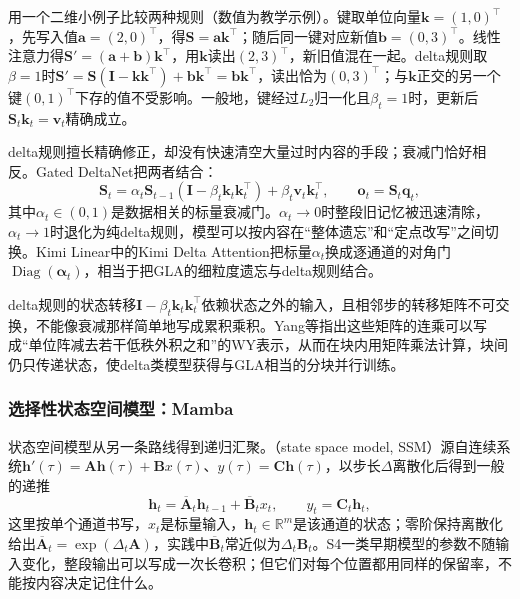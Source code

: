 用一个二维小例子比较两种规则（数值为教学示例）。键取单位向量$\bm k=(1,0)^{\top}$，先写入值$\bm a=(2,0)^{\top}$，得$\bm S=\bm a\bm k^{\top}$；随后同一键对应新值$\bm b=(0,3)^{\top}$。线性注意力得$\bm S'=(\bm a+\bm b)\bm k^{\top}$，用$\bm k$读出$(2,3)^{\top}$，新旧值混在一起。delta规则取$\beta=1$时$\bm S'=\bm S(\bm I-\bm k\bm k^{\top})+\bm b\bm k^{\top}=\bm b\bm k^{\top}$，读出恰为$(0,3)^{\top}$；与$\bm k$正交的另一个键$(0,1)^{\top}$下存的值不受影响。一般地，键经过$L_2$归一化且$\beta_t=1$时，更新后$\bm S_t\bm k_t=\bm v_t$精确成立。

delta规则擅长精确修正，却没有快速清空大量过时内容的手段；衰减门恰好相反。Gated DeltaNet把两者结合：
\begin{equation}
 \bm S_t=\alpha_t\bm S_{t-1}(\bm I-\beta_t\bm k_t\bm k_t^{\top})+\beta_t\bm v_t\bm k_t^{\top},\qquad
 \bm o_t=\bm S_t\bm q_t,
 \label{eq:nlp-llm-gated-delta}
\end{equation}
其中$\alpha_t\in(0,1)$是数据相关的标量衰减门。$\alpha_t\to0$时整段旧记忆被迅速清除，$\alpha_t\to1$时退化为纯delta规则，模型可以按内容在“整体遗忘”和“定点改写”之间切换。Kimi Linear中的Kimi Delta Attention把标量$\alpha_t$换成逐通道的对角门$\operatorname{Diag}(\bm\alpha_t)$，相当于把GLA的细粒度遗忘与delta规则结合。

delta规则的状态转移$\bm I-\beta_t\bm k_t\bm k_t^{\top}$依赖状态之外的输入，且相邻步的转移矩阵不可交换，不能像衰减那样简单地写成累积乘积。Yang等指出这些矩阵的连乘可以写成“单位阵减去若干低秩外积之和”的WY表示，从而在块内用矩阵乘法计算，块间仍只传递状态，使delta类模型获得与GLA相当的分块并行训练。

\subsubsection{选择性状态空间模型：Mamba}
\label{sec:nlp-llm-mamba}

状态空间模型从另一条路线得到递归汇聚。（state space model, SSM）源自连续系统$\bm h'(\tau)=\bm A\bm h(\tau)+\bm Bx(\tau)$、$y(\tau)=\bm C\bm h(\tau)$，以步长$\Delta$离散化后得到一般的递推
\begin{equation}
 \bm h_t=\overline{\bm A}_t\bm h_{t-1}+\overline{\bm B}_tx_t,\qquad
 y_t=\bm C_t\bm h_t,
 \label{eq:nlp-llm-state-space}
\end{equation}
这里按单个通道书写，$x_t$是标量输入，$\bm h_t\in\mathbb R^{m}$是该通道的状态；零阶保持离散化给出$\overline{\bm A}_t=\exp(\Delta_t\bm A)$，实践中$\overline{\bm B}_t$常近似为$\Delta_t\bm B_t$。S4一类早期模型的参数不随输入变化，整段输出可以写成一次长卷积；但它们对每个位置都用同样的保留率，不能按内容决定记住什么。

